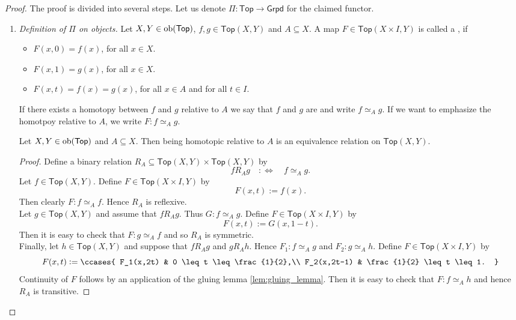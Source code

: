 \begin{proof}
	The proof is divided into several steps. Let us denote $\Pi : \mathsf{Top} \to \mathsf{Grpd}$ for the claimed functor.
	\begin{enumerate}[label = \textit{Step \arabic*:},wide = 0pt, itemsep = 1.5ex]
		\item \textit{Definition of $\Pi$ on objects.} Let $X,Y \in \operatorname{ob}(\mathsf{Top})$, $f,g \in \mathsf{Top}(X,Y)$ and $A \subseteq X$. A map $F \in \mathsf{Top}(X \times I,Y)$ is called a , if 
			\begin{itemize}[leftmargin = *]
				\item $F(x,0) = f(x)$, for all $x \in X$.
				\item $F(x,1) = g(x)$, for all $x \in X$.
				\item $F(x,t) = f(x) = g(x)$, for all $x \in A$ and for all $t \in I$.
			\end{itemize}
			If there exists a homotopy between $f$ and $g$ relative to $A$ we say that $f$ and $g$ are  and write $f \simeq_A g$. If we want to emphasize the homotpoy relative to $A$, we write $F : f \simeq_A g$.

			\begin{lemma}
				Let $X,Y \in \operatorname{ob}(\mathsf{Top})$ and $A \subseteq X$. Then being homotopic relative to $A$ is an equivalence relation on $\mathsf{Top}(X,Y)$.
			\end{lemma}

			\begin{proof}
				Define a binary relation $R_A \subseteq \mathsf{Top}(X,Y) \times \mathsf{Top}(X,Y)$ by
				\begin{equation*}
					f R_A g \quad :\Leftrightarrow  \quad f \simeq_A g.
				\end{equation*}
				Let $f \in \mathsf{Top}(X,Y)$. Define $F \in \mathsf{Top}(X\times I,Y)$ by 
				\begin{equation*}
				F(x,t) := f(x).
				\end{equation*}
				Then clearly $F : f \simeq_A f$. Hence $R_A$ is reflexive.\\
				Let $g \in \mathsf{Top}(X,Y)$ and assume that $f R_A g$. Thus $G : f \simeq_A g$. Define $F \in \mathsf{Top}(X \times I,Y)$ by
				\begin{equation*}
					F(x,t) := G(x,1-t).
				\end{equation*}
				Then it is easy to check that $F : g \simeq_A f$ and so $R_A$ is symmetric.\\
				Finally, let $h \in \mathsf{Top}(X,Y)$ and suppose that $f R_A g$ and $g R_A h$. Hence $F_1 : f \simeq_A g$ and $F_2 : g \simeq_A h$. Define $F \in \mathsf{Top}(X\times I,Y)$ by
				\begin{equation*}
					F(x,t) := \ccases{
						F_1(x,2t) & 0 \leq t \leq \frac{1}{2},\\
						F_2(x,2t-1) & \frac{1}{2} \leq t \leq 1.
					}
				\end{equation*}
				Continuity of $F$ follows by an application of the gluing lemma \ref{lem:gluing_lemma}. Then it is easy to check that $F : f \simeq_A h$ and hence $R_A$ is transitive.
			\end{proof}


\end{enumerate}
\end{proof}
